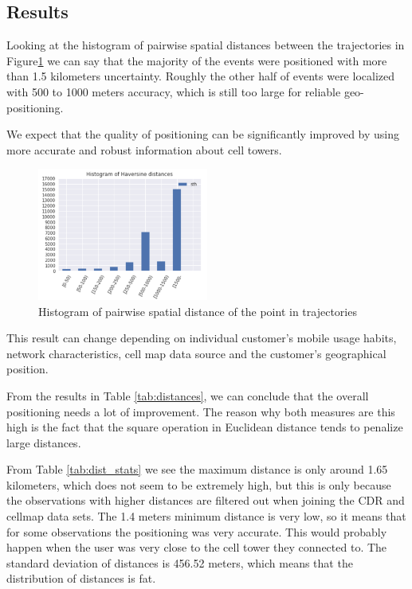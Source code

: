 \subsection{Results}
Looking at the histogram of pairwise spatial distances between the trajectories in Figure\ref{fig:hist} we can say that the majority of the events were positioned with more than 1.5 kilometers uncertainty. Roughly the other half of events were localized with 500 to 1000 meters accuracy, which is still too large for reliable geo-positioning.

We expect that the quality of positioning can be significantly improved by using more accurate and robust information about cell towers.

\begin{figure}[h]
    \centering
    \includegraphics[width=0.5\textwidth]{images/hist.png}
    \caption{Histogram of pairwise spatial distance of the point in trajectories}
    \label{fig:hist}
\end{figure}


This result can change depending on individual customer's mobile usage habits, network characteristics, cell map data source and the customer's geographical position.

From the results in Table \ref{tab:distances}, we can conclude that the overall positioning needs a lot of improvement. The reason why both measures are this high is the fact that the square operation in Euclidean distance tends to penalize large distances. 

From Table \ref{tab:dist_stats} we see the maximum distance is only around 1.65 kilometers, which does not seem to be extremely high, but this is only because the observations with higher distances are filtered out when joining the CDR and cellmap data sets. 
The 1.4 meters minimum distance is very low, so it means that for some observations the positioning was very accurate. This would probably happen when the user was very close to the cell tower they connected to. The standard deviation of distances is 456.52 meters, which means that the distribution of distances is fat.

